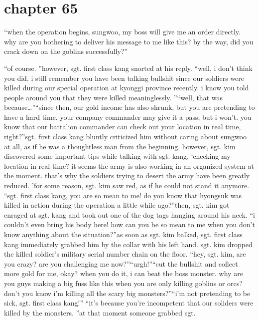 \section{chapter 65}

                            “when the operation begins, sungwoo, my boss will give me an order directly.
 why are you bothering to deliver his message to me like this? by the way, did you crack down on the goblins successfully?”




“of course.
”however, sgt.
 first class kang snorted at his reply.
“well, i don’t think you did.
 i still remember you have been talking bullshit since our soldiers were killed during our special operation at kyonggi province recently.
 i know you told people around you that they were killed meaninglessly.
”“well, that was because…”“since then, our gold income has also shrunk, but you are pretending to have a hard time.
 your company commander may give it a pass, but i won’t.
 you know that our battalion commander can check out your location in real time, right?”sgt.
 first class kang bluntly criticized him without caring about sungwoo at all, as if he was a thoughtless man from the beginning.
 however, sgt.
 kim discovered some important tips while talking with sgt.
 kang.
‘checking my location in real-time? it seems the army is also working in an organized system at the moment.
 that’s why the soldiers trying to desert the army have been greatly reduced.
’for some reason, sgt.
 kim saw red, as if he could not stand it anymore.
“sgt.
 first class kang, you are so mean to me! do you know that hyongsuk was killed in action during the operation a little while ago?”then, sgt.
 kim got enraged at sgt.
 kang and took out one of the dog tags hanging around his neck.
“i couldn’t even bring his body here! how can you be so mean to me when you don’t know anything about the situation?”as soon as sgt.
 kim balked, sgt.
 first class kang immediately grabbed him by the collar with his left hand.
 sgt.
 kim dropped the killed soldier’s military serial number chain on the floor.
“hey, sgt.
 kim, are you crazy? are you challenging me now?”“urgh!”“cut the bullshit and collect more gold for me, okay? when you do it, i can beat the boss monster.
 why are you guys making a big fuss like this when you are only killing goblins or orcs? don’t you know i’m killing all the scary big monsters?”“i’m not pretending to be sick, sgt.
 first class kang!”
“it’s because you’re incompetent that our soliders were killed by the monsters.
”at that moment someone grabbed sgt.
